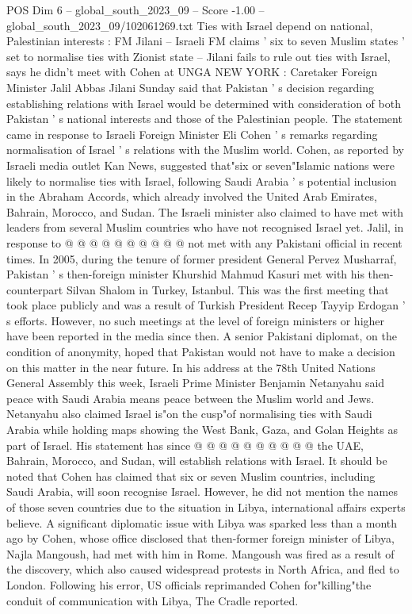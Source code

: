 \begin{textsample}{POS Dim 6 – global\_south\_2023\_09 – Score -1.00 – global\_south\_2023\_09/102061269.txt}  \label{ex:f6_pos_386}
Ties with Israel depend on national, Palestinian interests : FM Jilani -- Israeli FM claims ' six to seven Muslim states ' set to normalise ties with Zionist state -- Jilani fails to rule out ties with Israel, says he didn't meet with Cohen at UNGA NEW YORK : Caretaker Foreign Minister Jalil Abbas Jilani Sunday said that Pakistan ' s decision regarding establishing relations with Israel would be determined with consideration of both Pakistan ' s national interests and those of the Palestinian people.
The statement came in response to Israeli Foreign Minister Eli Cohen ' s remarks regarding normalisation of Israel ' s relations with the Muslim world.
Cohen, as reported by Israeli media outlet Kan News, suggested that"six or seven"Islamic nations were likely to normalise ties with Israel, following Saudi Arabia ' s potential inclusion in the Abraham Accords, which already involved the United Arab Emirates, Bahrain, Morocco, and Sudan.
The Israeli minister also claimed to have met with leaders from several Muslim countries who have not recognised Israel yet.
Jalil, in response to @ @ @ @ @ @ @ @ @ @ not met with any Pakistani official in recent times.
In 2005, during the tenure of former president General Pervez Musharraf, Pakistan ' s then-foreign minister Khurshid Mahmud Kasuri met with his then-counterpart Silvan Shalom in Turkey, Istanbul.
This was the first meeting that took place publicly and was a result of Turkish President Recep Tayyip Erdogan ' s efforts.
However, no such meetings at the level of foreign ministers or higher have been reported in the media since then.
A senior Pakistani diplomat, on the condition of anonymity, hoped that Pakistan would not have to make a decision on this matter in the near future.
In his address at the 78th United Nations General Assembly this week, Israeli Prime Minister Benjamin Netanyahu said peace with Saudi Arabia means peace between the Muslim world and Jews.
Netanyahu also claimed Israel is"on the cusp"of normalising ties with Saudi Arabia while holding maps showing the West Bank, Gaza, and Golan Heights as part of Israel.
His statement has since @ @ @ @ @ @ @ @ @ @ the UAE, Bahrain, Morocco, and Sudan, will establish relations with Israel.
It should be noted that Cohen has claimed that six or seven Muslim countries, including Saudi Arabia, will soon recognise Israel.
However, he did not mention the names of those seven countries due to the situation in Libya, international affairs experts believe.
A significant diplomatic issue with Libya was sparked less than a month ago by Cohen, whose office disclosed that then-former foreign minister of Libya, Najla Mangoush, had met with him in Rome.
Mangoush was fired as a result of the discovery, which also caused widespread protests in North Africa, and fled to London.
Following his error, US officials reprimanded Cohen for"killing"the conduit of communication with Libya, The Cradle reported.

\end{textsample}
